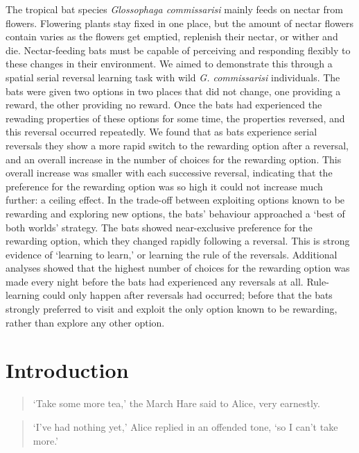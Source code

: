 \documentclass[
]{article}
\begin{document}
The tropical bat species \emph{Glossophaga commissarisi} mainly feeds on nectar from flowers. Flowering plants stay fixed in one place, but the amount of nectar flowers contain varies as the flowers get emptied, replenish their nectar, or wither and die. Nectar-feeding bats must be capable of perceiving and responding flexibly to these changes in their environment. We aimed to demonstrate this through a spatial serial reversal learning task with wild \emph{G. commissarisi} individuals. The bats were given two options in two places that did not change, one providing a reward, the other providing no reward. Once the bats had experienced the rewading properties of these options for some time, the properties reversed, and this reversal occurred repeatedly. We found that as bats experience serial reversals they show a more rapid switch to the rewarding option after a reversal, and an overall increase in the number of choices for the rewarding option. This overall increase was smaller with each successive reversal, indicating that the preference for the rewarding option was so high it could not increase much further: a ceiling effect. In the trade-off between exploiting options known to be rewarding and exploring new options, the bats' behaviour approached a `best of both worlds' strategy. The bats showed near-exclusive preference for the rewarding option, which they changed rapidly following a reversal. This is strong evidence of `learning to learn,' or learning the rule of the reversals. Additional analyses showed that the highest number of choices for the rewarding option was made every night before the bats had experienced any reversals at all. Rule-learning could only happen after reversals had occurred; before that the bats strongly preferred to visit and exploit the only option known to be rewarding, rather than explore any other option.

\hypertarget{introduction}{%
\section{Introduction}\label{introduction}}

\begin{quote}
`Take some more tea,' the March Hare said to Alice, very earnestly.
\end{quote}

\begin{quote}
`I've had nothing yet,' Alice replied in an offended tone, `so I can't take more.'
\end{quote}
\end{document}
